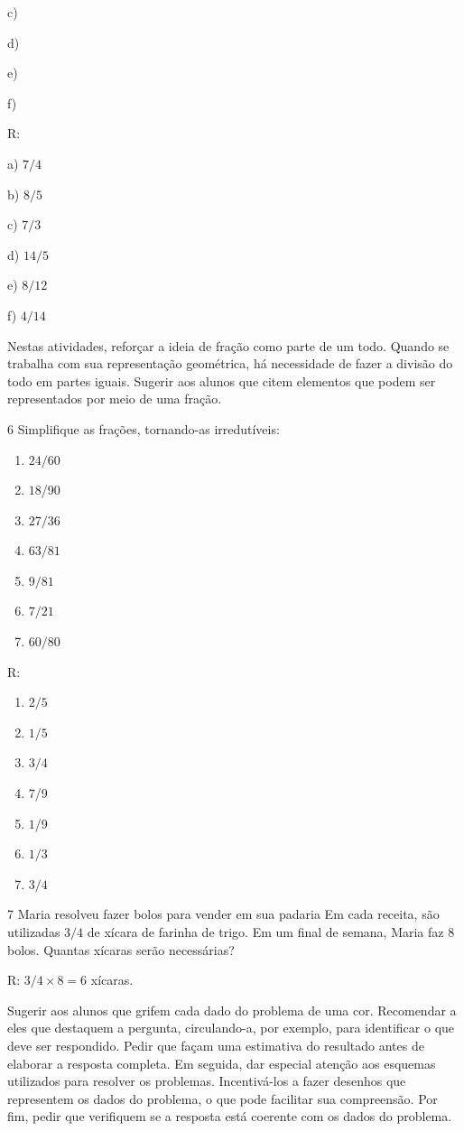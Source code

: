 c)

d)

e)

f)

R:

a) $7/4$

b) $8/5$

c) $7/3$

d) $14/5$

e) $8/12$

f) $4/14$

Nestas atividades, reforçar a ideia de fração como parte de um todo.
Quando se trabalha com sua representação geométrica, há necessidade de
fazer a divisão do todo em partes iguais. Sugerir aos alunos que citem
elementos que podem ser representados por meio de uma fração.

\num{6}  Simplifique as frações, tornando-as irredutíveis:

\begin{enumerate}
\def\labelenumi{\alph{enumi})}
\item
  $24/60$
\item
  $18$/90
\item
  $27/36$
\item
  $63/81$
\item
  $9/81$
\item
  $7/21$
\item
  $60/80$
\end{enumerate}

R:

\begin{enumerate}
\def\labelenumi{\alph{enumi})}
\item
  $2/5$
\item
  $1/5$
\item
  $3/4$
\item
  $7$/9
\item
  $1$/9
\item
  $1/3$
\item
  $3/4$
\end{enumerate}

\num{7}  Maria resolveu fazer bolos para vender em sua padaria Em cada
receita, são utilizadas $3/4$ de xícara de farinha de trigo. Em um final
de semana, Maria faz $8$ bolos. Quantas xícaras serão necessárias?

R: $3/4\times 8 = 6$ xícaras.

Sugerir aos alunos que grifem cada dado do problema de uma cor.
Recomendar a eles que destaquem a pergunta, circulando-a, por exemplo,
para identificar o que deve ser respondido. Pedir que façam uma
estimativa do resultado antes de elaborar a resposta completa. Em
seguida, dar especial atenção aos esquemas utilizados para resolver os
problemas. Incentivá-los a fazer desenhos que representem os dados do
problema, o que pode facilitar sua compreensão. Por fim, pedir que
verifiquem se a resposta está coerente com os dados do problema.

